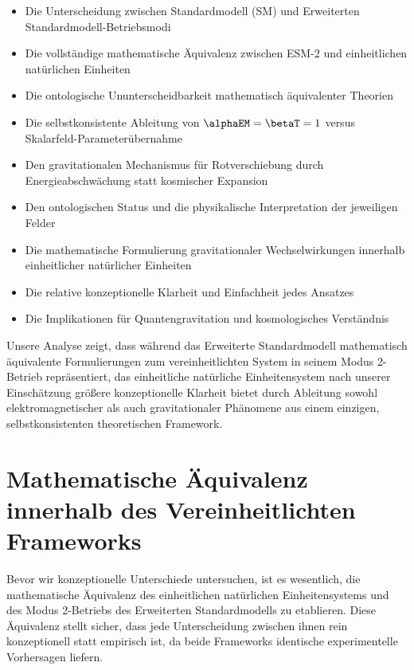 	\begin{itemize}
		\item Die Unterscheidung zwischen Standardmodell (SM) und Erweiterten Standardmodell-Betriebsmodi
		\item Die vollständige mathematische Äquivalenz zwischen ESM-2 und einheitlichen natürlichen Einheiten
		\item Die ontologische Ununterscheidbarkeit mathematisch äquivalenter Theorien
		\item Die selbstkonsistente Ableitung von $\alphaEM = \betaT = 1$ versus Skalarfeld-Parameterübernahme
		\item Den gravitationalen Mechanismus für Rotverschiebung durch Energieabschwächung statt kosmischer Expansion
		\item Den ontologischen Status und die physikalische Interpretation der jeweiligen Felder
		\item Die mathematische Formulierung gravitationaler Wechselwirkungen innerhalb einheitlicher natürlicher Einheiten
		\item Die relative konzeptionelle Klarheit und Einfachheit jedes Ansatzes
		\item Die Implikationen für Quantengravitation und kosmologisches Verständnis
	\end{itemize}
	
	Unsere Analyse zeigt, dass während das Erweiterte Standardmodell mathematisch äquivalente Formulierungen zum vereinheitlichten System in seinem Modus 2-Betrieb repräsentiert, das einheitliche natürliche Einheitensystem nach unserer Einschätzung größere konzeptionelle Klarheit bietet durch Ableitung sowohl elektromagnetischer als auch gravitationaler Phänomene aus einem einzigen, selbstkonsistenten theoretischen Framework.
	
	\section{Mathematische Äquivalenz innerhalb des Vereinheitlichten Frameworks}
	\label{sec:mathematical_equivalence}
	
	Bevor wir konzeptionelle Unterschiede untersuchen, ist es wesentlich, die mathematische Äquivalenz des einheitlichen natürlichen Einheitensystems und des Modus 2-Betriebs des Erweiterten Standardmodells zu etablieren. Diese Äquivalenz stellt sicher, dass jede Unterscheidung zwischen ihnen rein konzeptionell statt empirisch ist, da beide Frameworks identische experimentelle Vorhersagen liefern.
	
